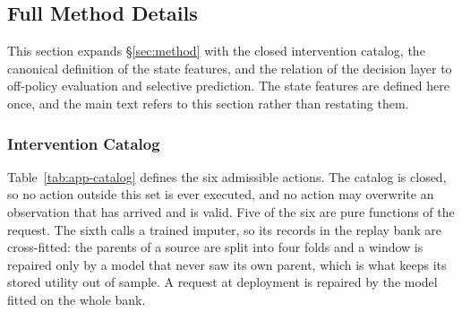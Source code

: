 \documentclass{article}
\begin{document}
\subsection{Full Method Details}
\label{app:method-details}
This section expands \S\ref{sec:method} with the closed intervention catalog, the canonical
definition of the state features, and the relation of the decision layer to off-policy
evaluation and selective prediction. The state features are defined here once, and the main
text refers to this section rather than restating them.

\subsubsection{Intervention Catalog}
\label{app:catalog}
Table~\ref{tab:app-catalog} defines the six admissible actions. The catalog is closed, so no
action outside this set is ever executed, and no action may overwrite an observation that has
arrived and is valid. Five of the six are pure functions of the request. The sixth calls a
trained imputer, so its records in the replay bank are cross-fitted: the parents of a source
are split into four folds and a window is repaired only by a model that never saw its own
parent, which is what keeps its stored utility out of sample. A request at deployment is
repaired by the model fitted on the whole bank.

\begin{table}[h]
  \caption{The six admissible interventions. Observed entries are the entries that are
  present and valid in the reference input $X^{a_0}$, and an action that modified them would
  violate the integrity constraint of \S\ref{sec:method-problem}.}
  \label{tab:app-catalog}
  \centering
  \small
  \setlength{\tabcolsep}{4pt}
\end{table}
\end{document}
